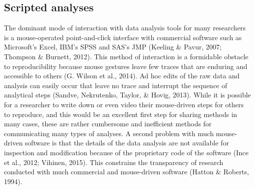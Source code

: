 \documentclass[american,man]{apa6}
\begin{document}
\subsection{Scripted analyses}\label{scripted-analyses}

The dominant mode of interaction with data analysis tools for many
researchers is a mouse-operated point-and-click interface with
commercial software such as Microsoft's Excel, IBM's SPSS and SAS's JMP
(Keeling \& Pavur, 2007; Thompson \& Burnett, 2012). This method of
interaction is a formidable obstacle to reproducibility because mouse
gestures leave few traces that are enduring and accessible to others (G.
Wilson et al., 2014). Ad hoc edits of the raw data and analysis can
easily occur that leave no trace and interrupt the sequence of
analytical steps (Sandve, Nekrutenko, Taylor, \& Hovig, 2013). While it
is possible for a researcher to write down or even video their
mouse-driven steps for others to reproduce, and this would be an
excellent first step for sharing methods in many cases, these are rather
cumbersome and inefficient methods for communicating many types of
analyses. A second problem with much mouse-driven software is that the
details of the data analysis are not available for inspection and
modification because of the proprietary code of the software (Ince et
al., 2012; Vihinen, 2015). This constrains the transparency of research
conducted with much commercial and mouse-driven software (Hatton \&
Roberts, 1994).
\end{document}
